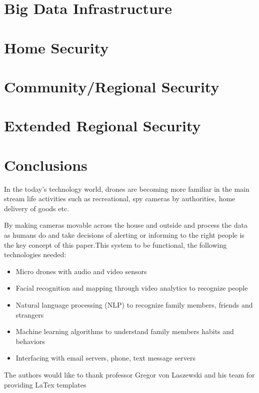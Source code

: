 \documentclass[sigconf]{acmart}
\begin{document}
\section{Big Data Infrastructure}

\section{Home Security}

\section{Community/Regional Security}

\section{Extended Regional Security}

\section{Conclusions}
In the today's technology world, drones are becoming more familiar in the main stream life activities such as recreational, spy cameras by authorities, home delivery of goods etc.

By making cameras movable across the house and outside and process the data as humans do and take decisions of alerting or informing to the right people is the key concept of this paper.This system to be functional, the following technologies needed:

\begin{itemize}
  
\item Micro drones with audio and video sensors\cite{Labs2016}

\item Facial recognition and mapping through video analytics to recognize people
	
\item Natural language processing (NLP) to recognize family members, friends and strangers

\item Machine learning algorithms to understand family members habits and behaviors

\item Interfacing with email servers, phone, text message servers

\end{itemize}

\begin{acks}
The authors would like to thank professor Gregor von Laszewski and his team for providing LaTex templates
\end{acks}


 
\end{document}
